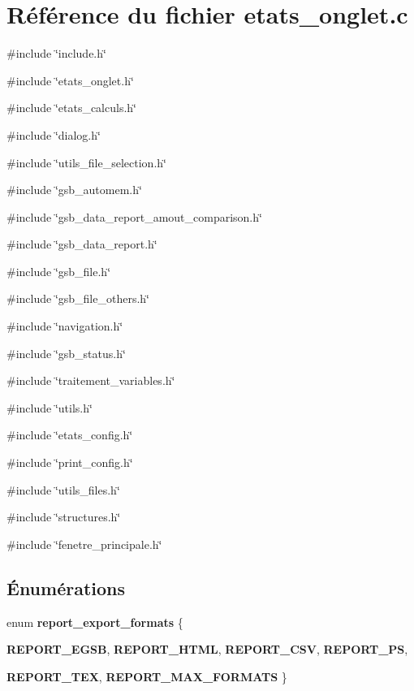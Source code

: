 \section{Référence du fichier etats\_\-onglet.c}
\label{etats__onglet_8c}
{\ttfamily \#include \char`\"{}include.h\char`\"{}}\par
{\ttfamily \#include \char`\"{}etats\_\-onglet.h\char`\"{}}\par
{\ttfamily \#include \char`\"{}etats\_\-calculs.h\char`\"{}}\par
{\ttfamily \#include \char`\"{}dialog.h\char`\"{}}\par
{\ttfamily \#include \char`\"{}utils\_\-file\_\-selection.h\char`\"{}}\par
{\ttfamily \#include \char`\"{}gsb\_\-automem.h\char`\"{}}\par
{\ttfamily \#include \char`\"{}gsb\_\-data\_\-report\_\-amout\_\-comparison.h\char`\"{}}\par
{\ttfamily \#include \char`\"{}gsb\_\-data\_\-report.h\char`\"{}}\par
{\ttfamily \#include \char`\"{}gsb\_\-file.h\char`\"{}}\par
{\ttfamily \#include \char`\"{}gsb\_\-file\_\-others.h\char`\"{}}\par
{\ttfamily \#include \char`\"{}navigation.h\char`\"{}}\par
{\ttfamily \#include \char`\"{}gsb\_\-status.h\char`\"{}}\par
{\ttfamily \#include \char`\"{}traitement\_\-variables.h\char`\"{}}\par
{\ttfamily \#include \char`\"{}utils.h\char`\"{}}\par
{\ttfamily \#include \char`\"{}etats\_\-config.h\char`\"{}}\par
{\ttfamily \#include \char`\"{}print\_\-config.h\char`\"{}}\par
{\ttfamily \#include \char`\"{}utils\_\-files.h\char`\"{}}\par
{\ttfamily \#include \char`\"{}structures.h\char`\"{}}\par
{\ttfamily \#include \char`\"{}fenetre\_\-principale.h\char`\"{}}\par
\subsection*{Énumérations}
\begin{DoxyCompactItemize}
\item 
enum {\bf report\_\-export\_\-formats} \{ \par
{\bf REPORT\_\-EGSB}, 
{\bf REPORT\_\-HTML}, 
{\bf REPORT\_\-CSV}, 
{\bf REPORT\_\-PS}, 
\par
{\bf REPORT\_\-TEX}, 
{\bf REPORT\_\-MAX\_\-FORMATS}
 \}
\end{DoxyCompactItemize}
